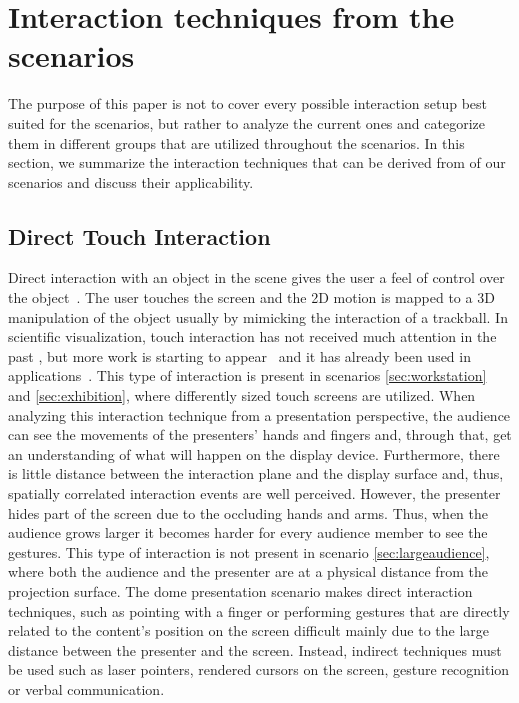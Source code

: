 \documentclass[review,journal]{vgtc}         %
\begin{document}
\section{Interaction techniques from the scenarios} \label{sec:techniques}
The purpose of this paper is not to cover every possible interaction setup best suited for the scenarios, but rather to analyze the current ones and categorize them in different groups that are utilized throughout the scenarios.
In this section, we summarize the interaction techniques that can be derived from of our scenarios and discuss their applicability.

\subsection{Direct Touch Interaction}
Direct interaction with an object in the scene gives the user a feel of control over the object~\cite{isenberg2009studying}. 
The user touches the screen and the 2D motion is mapped to a 3D manipulation of the object usually by mimicking the interaction of a trackball.
In scientific visualization, touch interaction has not received much attention in the past \cite{isenberg:hal-00781512}, but more work is starting to appear~\cite{Klein:2012:DSD:2322389.2322403} and it has already been used in applications~\cite{LRFPY11}.
This type of interaction is present in scenarios \ref{sec:workstation} and \ref{sec:exhibition}, where differently sized touch screens are utilized. 
When analyzing this interaction technique from a presentation perspective, the audience can see the movements of the presenters' hands and fingers and, through that, get an understanding of what will happen on the display device.
Furthermore, there is little distance between the interaction plane and the display surface and, thus, spatially correlated interaction events are well perceived.
However, the presenter hides part of the screen due to the occluding hands and arms.
Thus, when the audience grows larger it becomes harder for every audience member to see the gestures.
This type of interaction is not present in scenario \ref{sec:largeaudience}, where both the audience and the presenter are at a physical distance from the projection surface.
The dome presentation scenario makes direct interaction techniques, such as pointing with a finger or performing gestures that are directly related to the content's position on the screen difficult mainly due to the large distance between the presenter and the screen.
Instead, indirect techniques must be used such as laser pointers, rendered cursors on the screen, gesture recognition or verbal communication.
\end{document}
